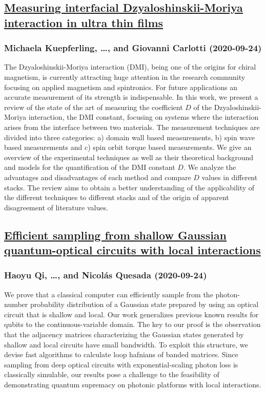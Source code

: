 \subsection*{\href{http://arxiv.org/abs/2009.11830v1}{Measuring interfacial Dzyaloshinskii-Moriya interaction in ultra thin  films}}
\subsubsection*{Michaela Kuepferling, \dots, and Giovanni Carlotti (2020-09-24)}
The Dzyaloshinskii-Moriya interaction (DMI), being one of the origins for
chiral magnetism, is currently attracting huge attention in the research
community focusing on applied magnetism and spintronics. For future
applications an accurate measurement of its strength is indispensable. In this
work, we present a review of the state of the art of measuring the coefficient
$D$ of the Dzyaloshinskii-Moriya interaction, the DMI constant, focusing on
systems where the interaction arises from the interface between two materials.
The measurement techniques are divided into three categories: a) domain wall
based measurements, b) spin wave based measurements and c) spin orbit torque
based measurements. We give an overview of the experimental techniques as well
as their theoretical background and models for the quantification of the DMI
constant $D$. We analyze the advantages and disadvantages of each method and
compare $D$ values in different stacks. The review aims to obtain a better
understanding of the applicability of the different techniques to different
stacks and of the origin of apparent disagreement of literature values.

\subsection*{\href{http://arxiv.org/abs/2009.11824v1}{Efficient sampling from shallow Gaussian quantum-optical circuits with  local interactions}}
\subsubsection*{Haoyu Qi, \dots, and Nicolás Quesada (2020-09-24)}
We prove that a classical computer can efficiently sample from the
photon-number probability distribution of a Gaussian state prepared by using an
optical circuit that is shallow and local. Our work generalizes previous known
results for qubits to the continuous-variable domain. The key to our proof is
the observation that the adjacency matrices characterizing the Gaussian states
generated by shallow and local circuits have small bandwidth. To exploit this
structure, we devise fast algorithms to calculate loop hafnians of banded
matrices. Since sampling from deep optical circuits with exponential-scaling
photon loss is classically simulable, our results pose a challenge to the
feasibility of demonstrating quantum supremacy on photonic platforms with local
interactions.

